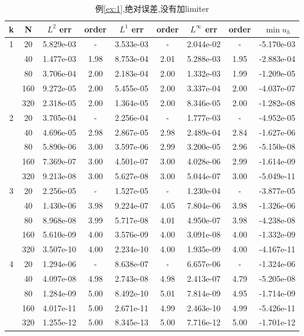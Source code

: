 \documentclass[a4paper, 11pt]{ctexart}
\numberwithin{equation}{section}
\numberwithin{figure}{section}
\begin{document}
\begin{table}[H]
  \centering
  \begin{tabular}{c|c|c|c|c|c|c|c|c} \toprule
 k  &  N &  $L^2$ err& order&$L^1$ err  &order & $L^\infty$ err&order& $\min u_h$ \\ \midrule
 \multirow{5}{*}{1}  & 20 & 5.829e-03 & - & 3.533e-03 & - & 2.044e-02 & - & -5.170e-03 \\
                     & 40 & 1.477e-03 & 1.98 & 8.753e-04 & 2.01 & 5.288e-03 & 1.95 & -2.883e-04 \\
                     & 80 & 3.706e-04 & 2.00 & 2.183e-04 & 2.00 & 1.332e-03 & 1.99 & -1.209e-05 \\
                     &160 & 9.272e-05 & 2.00 & 5.455e-05 & 2.00 & 3.337e-04 & 2.00 & -4.037e-07 \\
                     &320 & 2.318e-05 & 2.00 & 1.364e-05 & 2.00 & 8.346e-05 & 2.00 & -1.282e-08 \\ \midrule
 \multirow{5}{*}{2}  & 20 & 3.705e-04 & - & 2.256e-04 & - & 1.777e-03 & - & -4.952e-05 \\
                     & 40 & 4.696e-05 & 2.98 & 2.867e-05 & 2.98 & 2.489e-04 & 2.84 & -1.627e-06 \\
                     & 80 & 5.890e-06 & 3.00 & 3.597e-06 & 2.99 & 3.200e-05 & 2.96 & -5.150e-08 \\
                     &160 & 7.369e-07 & 3.00 & 4.501e-07 & 3.00 & 4.028e-06 & 2.99 & -1.614e-09 \\
                     &320 & 9.213e-08 & 3.00 & 5.627e-08 & 3.00 & 5.044e-07 & 3.00 & -5.049e-11 \\ \midrule
 \multirow{5}{*}{3}  & 20 & 2.256e-05 & - & 1.527e-05 & - & 1.230e-04 & - & -3.877e-05 \\
                     & 40 & 1.430e-06 & 3.98 & 9.224e-07 & 4.05 & 7.804e-06 & 3.98 & -1.326e-06 \\
                     & 80 & 8.968e-08 & 3.99 & 5.717e-08 & 4.01 & 4.950e-07 & 3.98 & -4.238e-08 \\
                     &160 & 5.610e-09 & 4.00 & 3.576e-09 & 4.00 & 3.091e-08 & 4.00 & -1.332e-09 \\
                     &320 & 3.507e-10 & 4.00 & 2.234e-10 & 4.00 & 1.935e-09 & 4.00 & -4.167e-11 \\ \midrule
 \multirow{5}{*}{4}  & 20 & 1.294e-06 & - & 8.638e-07 & - & 6.657e-06 & - & -1.324e-06 \\
                     & 40 & 4.097e-08 & 4.98 & 2.743e-08 & 4.98 & 2.413e-07 & 4.79 & -5.205e-08 \\
                     & 80 & 1.284e-09 & 5.00 & 8.492e-10 & 5.01 & 7.814e-09 & 4.95 & -1.714e-09 \\
                     &160 & 4.017e-11 & 5.00 & 2.671e-11 & 4.99 & 2.463e-10 & 4.99 & -5.426e-11 \\
                     &320 & 1.255e-12 & 5.00 & 8.345e-13 & 5.00 & 7.716e-12 & 5.00 & -1.701e-12 \\ \bottomrule
  \end{tabular}
  \caption{例\ref{ex:1},绝对误差,没有加limiter}
\end{table}
\end{document}
